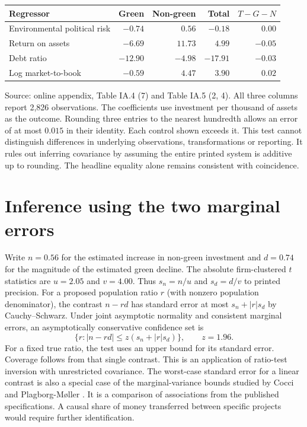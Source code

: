 \documentclass[11pt]{article}
\begin{document}
\begin{center}
\begin{tabular}{lrrrr}
\toprule
Regressor & Green & Non-green & Total & $T-G-N$\\
\midrule
Environmental political risk & $-0.74$ & $0.56$ & $-0.18$ & $0.00$\\
Return on assets & $-6.69$ & $11.73$ & $4.99$ & $-0.05$\\
Debt ratio & $-12.90$ & $-4.98$ & $-17.91$ & $-0.03$\\
Log market-to-book & $-0.59$ & $4.47$ & $3.90$ & $0.02$\\
\bottomrule
\end{tabular}
\end{center}
\noindent Source: online appendix, Table IA.4 (7) and Table IA.5 (2, 4). All three columns report 2,826 observations. The coefficients use investment per thousand of assets as the outcome. Rounding three entries to the nearest hundredth allows an error of at most $0.015$ in their identity. Each control shown exceeds it. This test cannot distinguish differences in underlying observations, transformations or reporting. It rules out inferring covariance by assuming the entire printed system is additive up to rounding. The headline equality alone remains consistent with coincidence.

\clearpage
\section{Inference using the two marginal errors}
Write $n=0.56$ for the estimated increase in non-green investment and $d=0.74$ for the magnitude of the estimated green decline. The absolute firm-clustered $t$ statistics are $u=2.05$ and $v=4.00$. Thus $s_n=n/u$ and $s_d=d/v$ to printed precision. For a proposed population ratio $r$ (with nonzero population denominator), the contrast $n-rd$ has standard error at most $s_n+|r|s_d$ by Cauchy--Schwarz. Under joint asymptotic normality and consistent marginal errors, an asymptotically conservative confidence set is
\[
 \{r: |n-rd|\le z(s_n+|r|s_d)\},\qquad z=1.96 .
\]
For a fixed true ratio, the test uses an upper bound for its standard error. Coverage follows from that single contrast. This is an application of ratio-test inversion \cite{fieller} with unrestricted covariance. The worst-case standard error for a linear contrast is also a special case of the marginal-variance bounds studied by Cocci and Plagborg-M{\o}ller \cite{cocci}. It is a comparison of associations from the published specifications. A causal share of money transferred between specific projects would require further identification.
\end{document}
